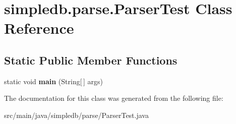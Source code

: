 \hypertarget{classsimpledb_1_1parse_1_1ParserTest}{}\section{simpledb.\+parse.\+Parser\+Test Class Reference}
\label{classsimpledb_1_1parse_1_1ParserTest}
\subsection*{Static Public Member Functions}
\begin{DoxyCompactItemize}
\item 
\mbox{\label{classsimpledb_1_1parse_1_1ParserTest_a6eb8a77dac1015a7dfcbe001b38288f2}} 
static void {\bfseries main} (String\mbox{[}$\,$\mbox{]} args)
\end{DoxyCompactItemize}


The documentation for this class was generated from the following file\+:\begin{DoxyCompactItemize}
\item 
src/main/java/simpledb/parse/Parser\+Test.\+java\end{DoxyCompactItemize}
